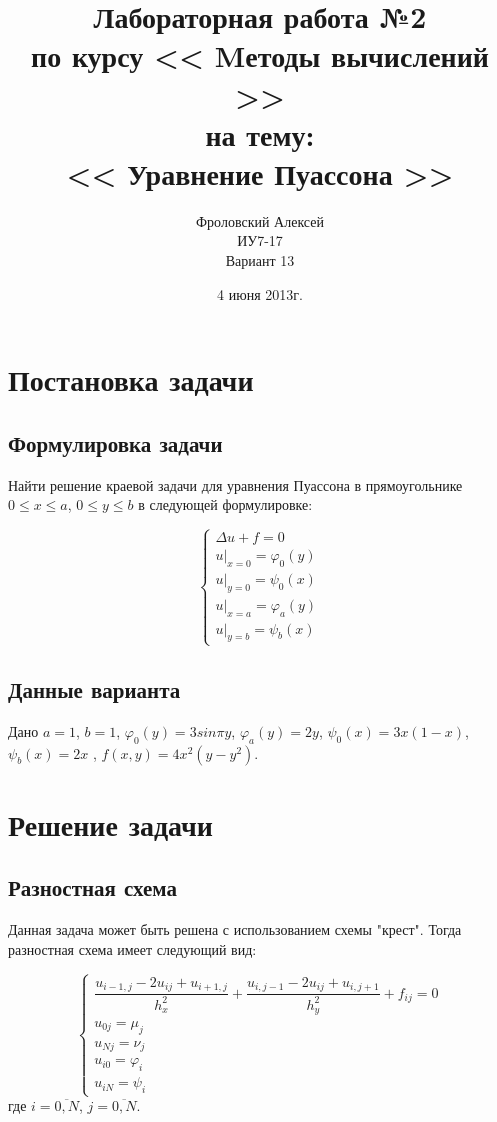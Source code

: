 \documentclass[a4paper,12pt]{report}
\author{Фроловский Алексей \\ ИУ7-17 \\ Вариант 13}
\title{Лабораторная работа №2 \\ по курсу << Mетоды вычислений >>  \\ на тему: \\  
<< Уравнение Пуассона >> }
\date{4 июня 2013г.}
\begin{document}
\maketitle

\chapter{Постановка задачи}
\section{Формулировка задачи}
Найти решение краевой задачи для уравнения Пуассона в прямоугольнике $0 \le x \le a$,
$0 \le y \le b$ в следующей формулировке:

\begin{displaymath}
	\left\{
		\begin{array}{l}
			\Delta u + f = 0 \\
			u\vert_{x=0} =  \varphi_{0}(y)  \\
			u\vert_{y=0} =  \psi_{0}(x)  \\
			u\vert_{x=a} =  \varphi_{a}(y) \\
			u\vert_{y=b} =  \psi_{b}(x)
		\end{array} \right.
\end{displaymath}

\section{Данные варианта}
Дано $a = 1$, $b = 1$, $\varphi_{0}(y) = 3sin\pi y$, $\varphi_{a}(y) = 2y$, $\psi_{0}(x) = 3x(1-x)$, 
$\psi_{b}(x) = 2x$ , $f(x, y) = 4x^{2}(y-y^{2})$.

\chapter{Решение задачи}
\section{Разностная схема}
Данная задача может быть решена с использованием схемы "крест". Тогда разностная схема имеет
следующий вид:

\begin{displaymath}
	\left\{
		\begin{array}{l}
			\dfrac{u_{i-1, j} - 2u_{ij} + u_{i+1, j}}{h_{x}^{2}} + \dfrac{u_{i, j-1} - 2u_{ij} + u_{i, j+1}}{h_{y}^{2}} + f_{ij} = 0 \\
			u_{0j} = \mu_{j} \\
			u_{Nj} = \nu_{j}  \\
			u_{i0} = \varphi_{i} \\
			u_{iN} = \psi_{i}
		\end{array} \right.
\end{displaymath}
где $i = \overline{0, N}$, $j = \overline{0, N}$.
\end{document}
